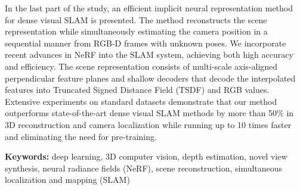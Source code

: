 \vspace{2ex}
In the last part of the study, an efficient implicit neural representation method for dense visual SLAM is presented. The method reconstructs the scene representation while simultaneously estimating the camera position in a sequential manner from RGB-D frames with unknown poses. We incorporate recent advances in NeRF into the SLAM system, achieving both high accuracy and efficiency. The scene representation consists of multi-scale axis-aligned perpendicular feature planes and shallow decoders that decode the interpolated features into Truncated Signed Distance Field (TSDF) and RGB values. Extensive experiments on standard datasets demonstrate that our method outperforms state-of-the-art dense visual SLAM methods by more than 50\% in 3D reconstruction and camera localization while running up to 10 times faster and eliminating the need for pre-training.

\vspace{2ex}
\textbf{Keywords:} deep learning, 3D computer vision, depth estimation, novel view synthesis, neural radiance fields (NeRF), scene reconstruction, simultaneous localization and mapping (SLAM)


